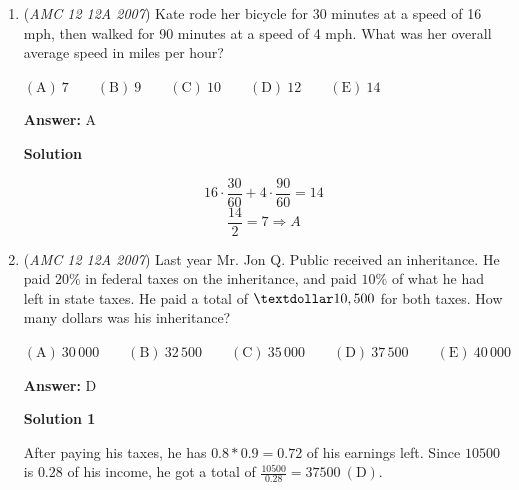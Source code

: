 \begin{enumerate}
 \textbf{Answer: }A



\textbf{Solution 1}

Let $n$ be the smaller term. Then $n+2=3n \Longrightarrow 2n = 2 \Longrightarrow n=1$

            \begin{itemize}
        \item Thus, the answer is $1+(1+2)=4 \mathrm{(A)}$
            \end{itemize}
            




\textbf{Solution 2}


            \begin{itemize}
        \item By trial and error, 1 and 3 work. 1+3=4.
            \end{itemize}
            


	\item (\textit{AMC 12 12A 2007}) Kate rode her bicycle for 30 minutes at a speed of 16 mph, then walked for 90 minutes at a speed of 4 mph. What was her overall average speed in miles per hour?


 $\mathrm{(A)}\ 7\qquad \mathrm{(B)}\ 9\qquad \mathrm{(C)}\ 10\qquad \mathrm{(D)}\ 12\qquad \mathrm{(E)}\ 14$

 \textbf{Answer: }A



\textbf{Solution}


 \[16 \cdot \frac{30}{60}+4\cdot\frac{90}{60}=14\]
 \[\frac{14}2=7\Rightarrow\boxed{A}\]



	\item (\textit{AMC 12 12A 2007}) Last year Mr. Jon Q. Public received an inheritance. He paid $20\%$ in federal taxes on the inheritance, and paid $10\%$ of what he had left in state taxes. He paid a total of $\textdollar10,500$ for both taxes. How many dollars was his inheritance?


 $(\mathrm {A})\ 30\,000 \qquad (\mathrm {B})\ 32\,500 \qquad (\mathrm {C})\ 35\,000 \qquad (\mathrm {D})\ 37\,500 \qquad (\mathrm {E})\ 40\,000$

 \textbf{Answer: }D



\textbf{Solution 1}

After paying his taxes, he has $0.8*0.9=0.72$ of his earnings left. Since $10500$ is $0.28$ of his income, he got a total of $\frac{10500}{0.28}=37500\  \mathrm{(D)}$.


\end{enumerate}

